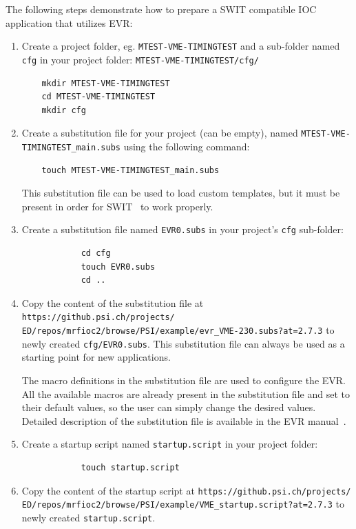 \documentclass[12pt,a4paper]{article}
\newcommand{\latestDriverVersion}{2.7.3}
\begin{document}
The following steps demonstrate how to prepare a SWIT compatible IOC application that utilizes EVR:
\begin{enumerate}

	\item Create a project folder, eg. \texttt{MTEST-VME-TIMINGTEST} and a sub-folder named \texttt{cfg} in your project folder: \texttt{MTEST-VME-TIMINGTEST/cfg/}
\begin{verbatim}
	mkdir MTEST-VME-TIMINGTEST
	cd MTEST-VME-TIMINGTEST
	mkdir cfg
\end{verbatim}

	\item Create a substitution file for your project (can be empty), named \texttt{MTEST-VME-TIMINGTEST\_main.subs} using the following command: 
\begin{verbatim}
	touch MTEST-VME-TIMINGTEST_main.subs
\end{verbatim}	
	This substitution file can be used to load custom templates, but it must be present in order for SWIT~\cite{swit} to work properly.
	
	\item 
		Create a substitution file named \texttt{EVR0.subs} in your project's \texttt{cfg} sub-folder:
		\begin{verbatim}
			cd cfg
			touch EVR0.subs
			cd ..
		\end{verbatim}
	\item Copy the content of the substitution file  at \texttt{https://github.psi.ch/projects/} \texttt{ED/repos/mrfioc2/browse/PSI/example/evr\_VME-230.subs?at=\latestDriverVersion} to newly created \texttt{cfg/EVR0.subs}. This substitution file can always be used as a starting point for new applications.
	
	The macro definitions in the substitution file are used to configure the EVR. All the available macros are already present in the substitution file and set to their default values, so the user can simply change the desired values. Detailed description of the substitution file is available in the EVR manual~\cite{evr_manual}.

	\item 
		Create a startup script named \texttt{startup.script} in your project folder:
		\begin{verbatim}
			touch startup.script
		\end{verbatim}
	\item 
		Copy the content of the startup script at \texttt{https://github.psi.ch/projects/} \texttt{ED/repos/mrfioc2/browse/PSI/example/VME\_startup.script?at=\latestDriverVersion} to newly created \texttt{startup.script}.


\end{enumerate}
\end{document}
